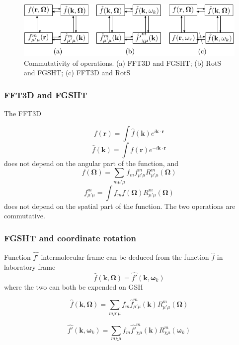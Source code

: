 \begin{figure}[h]
\begin{centering}
\includegraphics{_figure/algorithms_commutativity}
\par\end{centering}

\caption [Commutativity of operations]{Commutativity of operations. (a) FFT3D and FGSHT; (b) RotS and FGSHT;
(c) FFT3D and RotS\label{fig:Commutativity-of-operations}}
\end{figure}



\subsubsection{FFT3D and FGSHT}

The FFT3D

\[
f(\mathbf{r})=\int\hat{f}(\mathbf{k})e^{i\mathbf{k}\cdot\mathbf{r}}
\]
\[
\hat{f}(\mathbf{k})=\int f(\mathbf{r})e^{-i\mathbf{k}\cdot\mathbf{r}}
\]
does not depend on the angular part of the function, and
\[
f(\mathbf{\Omega})=\sum_{m\mu'\mu}f_{m}f_{\mu'\mu}^{m}R_{\mu'\mu}^{m}(\mathbf{\Omega})
\]
\[
f_{\mu'\mu}^{m}=\int f_{m}f(\mathbf{\Omega})R_{\mu'\mu}^{m}(\mathbf{\Omega})
\]
does not depend on the spatial part of the function. The two operations
are commutative.


\subsubsection{FGSHT and coordinate rotation}

Function $\hat{f'}$ intermolecular frame can be deduced from the
function $\hat{f}$ in laboratory frame 
\[
\hat{f}(\mathbf{k},\mathbf{\Omega})=\hat{f'}(\mathbf{k},\boldsymbol{\omega}_{k})
\]
where the two can both be expended on GSH %

\[
\hat{f}(\mathbf{k},\mathbf{\Omega})=\sum_{m\mu'\mu}f_{m}\hat{f}_{\mu'\mu}^{m}(\mathbf{k})R_{\mu'\mu}^{m}(\mathbf{\Omega})
\]


\[
\hat{f'}(\mathbf{k},\boldsymbol{\omega}_{k})=\sum_{m\chi\mu}f_{m}\hat{f'}_{\chi\mu}^{m}(\mathbf{k})R_{\chi\mu}^{m}(\boldsymbol{\omega}_{k})
\]


